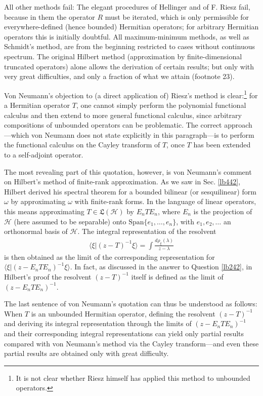 \documentclass[12pt,b5paper,notitlepage]{article}
\theoremstyle{definition}
\theoremstyle{plain}
\newcommand{\fk}{\mathfrak}
\newcommand{\Span}{\mathrm{Span}}
\newcommand{\bk}[1]{\langle {#1}\rangle}
\newcommand{\MH}{\mathcal H}
\numberwithin{equation}{section}
\begin{document}
\begin{displayquote}
All other methods fail: The elegant procedures of Hellinger and of F. Riesz fail, because in them the operator $R$ must be iterated, which is only permissible for everywhere-defined (hence bounded) Hermitian operators; for arbitrary Hermitian operators this is initially doubtful. All maximum-minimum methods, as well as Schmidt's method, are from the beginning restricted to cases without continuous spectrum. The original Hilbert method (approximation by finite-dimensional truncated operators) alone allows the derivation of certain results; but only with very great difficulties, and only a fraction of what we attain (footnote 23).
\end{displayquote}


Von Neumann's objection to (a direct application of) Riesz's method is clear:\footnote{It is not clear whether Riesz himself has applied this method to unbounded operators.} for a Hermitian operator $T$, one cannot simply perform the polynomial functional calculus and then extend to more general functional calculus, since arbitrary compositions of unbounded operators can be problematic. The correct approach---which von Neumann does not state explicitly in this paragraph---is to perform the functional calculus on the Cayley transform of $T$, once $T$ has been extended to a self-adjoint operator.


The most revealing part of this quotation, however, is von Neumann's comment on Hilbert's method of finite-rank approximation. As we saw in Sec. \ref{lb442}, Hilbert derived his spectral theorem for a bounded bilinear (or sesquilinear) form $\omega$ by approximating $\omega$ with finite-rank forms. In the language of linear operators, this means approximating $T\in\fk L(\MH)$ by $E_nTE_n$, where $E_n$ is the projection of $\MH$ (here assumed to be separable) onto $\Span\{e_1,\dots,e_n\}$, with $e_1,e_2,\dots$ an orthonormal basis of $\MH$. The integral representation of the resolvent
\begin{align*}
\bk{\xi|(z-T)^{-1}\xi}=\int\frac{d\rho_\xi(\lambda)}{z-\lambda}
\end{align*}
is then obtained as the limit of the corresponding representation for $\bk{\xi|(z-E_nTE_n)^{-1}\xi}$. In fact, as discussed in the answer to Question \ref{lb242}, in Hilbert's proof the resolvent $(z-T)^{-1}$ itself is defined as the limit of $(z-E_nTE_n)^{-1}$.


The last sentence of von Neumann's quotation can thus be understood as follows: When $T$ is an unbounded Hermitian operator, defining the resolvent $(z-T)^{-1}$ and deriving its integral representation through the limits of $(z-E_nTE_n)^{-1}$ and their corresponding integral representations can yield only partial results compared with von Neumann's method via the Cayley transform---and even these partial results are obtained only with great difficulty.
\end{document}
